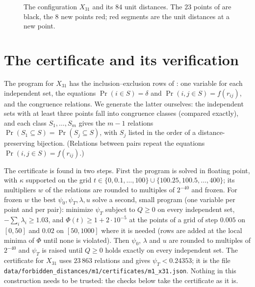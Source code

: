\documentclass[11pt,a4paper]{amsart}
\theoremstyle{remark}
\newcommand{\NPTS}{31}
\newcommand{\NNEW}{8}
\newcommand{\MONE}{0.24353}
\newcommand{\NUNIT}{84}
\newcommand{\NCONG}{23\,863}
\begin{document}
\begin{figure}[ht]
\centering

\caption{The configuration $X_{\NPTS}$ and its $\NUNIT$ unit distances. The $23$ points of \cite{ACMVZ} are black, the
$\NNEW$ new points red; red segments are the unit distances at a new point.}\label{fig:config}
\end{figure}

\section{The certificate and its verification}\label{sec:checks}

The program for $X_{\NPTS}$ has the inclusion--exclusion rows of \cite{ACMVZ}: one variable for each independent set,
the equations $\Pr(i\in S)=\delta$ and $\Pr(i,j\in S)=f(r_{ij})$, and the congruence relations. We generate the latter
ourselves: the independent sets with at least three points fall into congruence classes (compared exactly), and each
class $S_1,\dots,S_m$ gives the $m-1$ relations $\Pr(S_1\subseteq S)=\Pr(S_j\subseteq S)$, with $S_j$ listed in the order
of a distance-preserving bijection. (Relations between pairs repeat the equations $\Pr(i,j\in S)=f(r_{ij})$.)

The certificate is found in two steps. First the program is solved in floating point, with $\kappa$ supported on the
grid $t\in\{0,0.1,\dots,100\}\cup\{100.25,100.5,\dots,400\}$; its multipliers $w$ of the relations are rounded to
multiples of $2^{-40}$ and frozen.
For frozen $w$ the best $\psi_0,\psi_T,\lambda,u$ solve a second, small program (one variable per point and per pair):
minimize $\psi_T$ subject to $Q\ge0$ on every independent set, $-\sum_i\lambda_i\ge1.03$, and
$\Phi(t)\ge1+2\cdot10^{-5}$ at the points of a grid of step $0.005$ on $[0,50]$ and $0.02$ on $[50,1000]$ where it is
needed (rows are added at the local minima of $\Phi$ until none is violated). Then $\psi_0$, $\lambda$ and $u$ are
rounded to multiples of $2^{-40}$ and $\psi_T$ is raised until $Q\ge0$ holds exactly on every independent set. The
certificate for $X_{\NPTS}$ uses $\NCONG$ relations and gives $\psi_T<\MONE$; it is the file
\texttt{data/forbidden\_distances/m1/certificates/m1\_x31.json}. Nothing in this construction needs to be trusted: the checks below take the certificate as it is.
\end{document}
